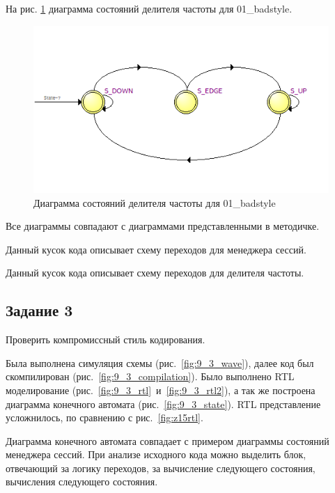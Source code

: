 \documentclass[a4paper,14pt]{article}
\begin{document}
	На рис. \ref{fig:z15autoclkdivider} диаграмма состояний делителя частоты для 01\_badstyle.
	
	\begin{figure}[H]
		\centering
		\includegraphics[width=0.6\linewidth]{images/z1_5_auto_clk_divider}
		\caption{Диаграмма состояний делителя частоты для 01\_badstyle}
		\label{fig:z15autoclkdivider}
	\end{figure}

	Все диаграммы совпадают с диаграммами представленными в методичке.
	
	Данный кусок кода описывает схему переходов для менеджера сессий.
	
	{\small {}}

	Данный кусок кода описывает схему переходов для делителя частоты.
	
	{\small {}}
	
	\subsection{Задание 3}
	
	Проверить компромиссный стиль кодирования.
	
	Была выполнена симуляция схемы (рис.~\ref{fig:9_3_wave}), далее код был скомпилирован (рис.~\ref{fig:9_3_compilation}).
	Было выполнено RTL моделирование (рис.~\ref{fig:9_3_rtl}~и~\ref{fig:9_3_rtl2}), а так же построена диаграмма конечного автомата (рис.~\ref{fig:9_3_state}).
	RTL представление усложнилось, по сравнению с рис.~\ref{fig:z15rtl}.
	
	Диаграмма конечного автомата совпадает с примером диаграммы состояний менеджера сессий.
	При анализе исходного кода можно выделить блок, отвечающий за логику переходов, за вычисление следующего состояния, вычисления следующего состояния.
	
\end{document}
